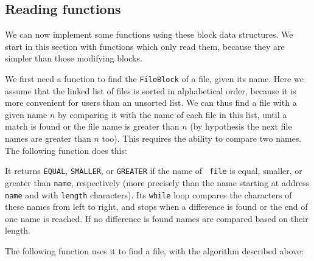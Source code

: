 \subsection{Reading functions}

We can now implement some functions using these block data structures. We start
in this section with functions which only read them, because they are simpler
than those modifying blocks.

We first need a function to find the {\tt FileBlock} of a file, given its name.
Here we assume that the linked list of files is sorted in alphabetical order,
because it is more convenient for users than an unsorted list. We can thus find
a file with a given name $n$ by comparing it with the name of each file in this
list, until a match is found or the file name is greater than $n$ (by
hypothesis the next file names are greater than $n$ too). This requires the
ability to compare two names. The following function does this:


It returns {\tt EQUAL}, {\tt SMALLER}, or {\tt GREATER} if the name of {\tt
file} is equal, smaller, or greater than {\tt name}, respectively (more
precisely than the name starting at address {\tt name} and with {\tt length}
characters). Its {\tt while} loop compares the characters of these names from
left to right, and stops when a difference is found or the end of one name is
reached. If no difference is found names are compared based on their length.

The following function uses it to find a file, with the algorithm described
above:


